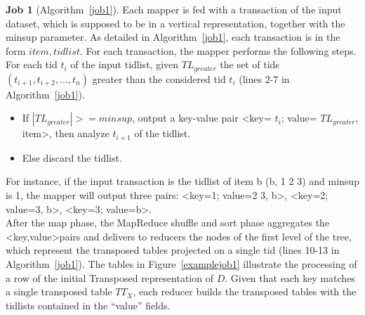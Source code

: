 \textbf{Job 1} (Algorithm~\ref{job1}). Each mapper is fed
with a transaction of the input dataset, which is supposed to be in a vertical
representation, together with the minsup parameter. As detailed in
Algorithm~\ref{job1}, each transaction is in the form $item,tidlist$.
For each transaction, the mapper performs
the following steps. For each tid $t_{i}$ of the input tidlist, given
$TL_{greater}$ the set of tids $(t_{i+1},t_{i+2},...,t_{n})$ greater than the
considered tid $t_{i}$ (lines 2-7 in Algorithm~\ref{job1}).
\begin{itemize}
\item If $|TL_{greater}| >= minsup$, output a key-value pair \textless key=
$t_{i}$; value= $TL_{greater}$, item\textgreater, then analyze $t_{i+1}$ of the
tidlist.

 \item Else discard the tidlist.
\end {itemize}
 For instance, if the input transaction is the tidlist of item b (b, 1 2 3) and
 minsup is 1, the mapper will output three pairs:  \textless key=1; value=2 3,
 b\textgreater,  \textless  key=2; value=3, b\textgreater,  \textless  key=3;
 value=b\textgreater .\\
 After the map phase, the MapReduce shuffle and sort phase aggregates the
 \textless key,value\textgreater pairs and delivers to reducers the nodes of the
 first level of the tree, which represent the transposed tables projected on a
 single tid (lines 10-13 in Algorithm~\ref{job1}). The tables in Figure~\ref{examplejob1} illustrate the processing of
a row of the initial Transposed  representation of $D$.
Given that each key matches a single transposed table $TT_{X}$, each
reducer builds the transposed tables with the tidlists contained in the
``value'' fields.


